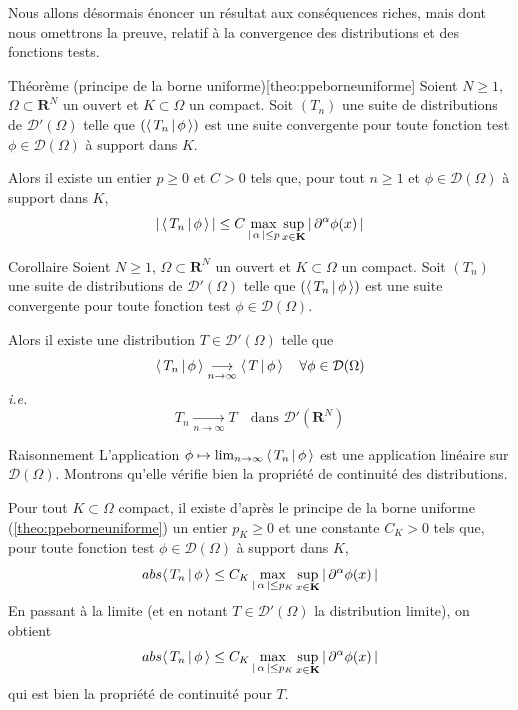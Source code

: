         Nous allons désormais énoncer un résultat aux conséquences riches, mais dont nous omettrons la preuve, relatif à la convergence des distributions et des fonctions tests.

        \begin{omed}{Théorème (principe de la borne uniforme)}[theo:ppeborneuniforme]
            Soient $N \geq 1$, $\Omega \subset \mathbf{R}^N$ un ouvert et $K \subset \Omega$ un compact. Soit $(T_n)$ une suite de distributions de $\mathcal{D}'(\Omega)$ telle que $(\left< \, T_n \, \middle| \, \phi \, \right>)$ est une suite convergente pour toute fonction test $\phi \in \mathcal{D}(\Omega)$ à support dans $K$. 
            
            Alors il existe un entier $p \geq 0$ et $C> 0$ tels que, pour tout $n \geq 1$ et $\phi \in \mathcal{D}(\Omega)$ à support dans $K$, 
            \[ \left\lvert \, \left< \, T_n \, \middle| \, \phi \, \right> \, \right\rvert \leq C \max_{\left\lvert \, \alpha \, \right\rvert \leq p} \sup_{x \in \mathbf{K}} \left\lvert \, \partial^{\alpha} \phi(x) \, \right\rvert \] 
        \end{omed}

        \begin{omed}{Corollaire}
            Soient $N \geq 1$, $\Omega \subset \mathbf{R}^N$ un ouvert et $K \subset \Omega$ un compact. Soit $(T_n)$ une suite de distributions de $\mathcal{D}'(\Omega)$ telle que $(\left< \, T_n \, \middle| \, \phi \, \right>)$ est une suite convergente pour toute fonction test $\phi \in \mathcal{D}(\Omega)$. 

            Alors il existe une distribution $T \in \mathcal{D}'(\Omega)$ telle que 
            \[ \left< \, T_n \, \middle| \, \phi \, \right> \underset{n \to \infty}{\longrightarrow} \left< \, T \, \middle| \, \phi \, \right> \quad \forall \phi \in \mathcal{D}(\Omega) \]  
            \textit{i.e.}
            \[ T_n \underset{n \to \infty}{\longrightarrow} T \quad \text{dans } \mathcal{D}'(\mathbf{R}^N) \]      
        \end{omed}

        \begin{demo}{Raisonnement}
            L’application $\phi \mapsto \lim_{n \to \infty} \left< \, T_n \, \middle| \, \phi \, \right>$ est une application linéaire sur $\mathcal{D}(\Omega)$. Montrons qu’elle vérifie bien la propriété de continuité des distributions.

            Pour tout $K \subset \Omega$ compact, il existe d’après le principe de la borne uniforme (\ref{theo:ppeborneuniforme}) un entier $p_K \geq 0$ et une constante $C_K > 0$ tels que, pour toute fonction test $\phi \in \mathcal{D}(\Omega)$ à support dans $K$,
            \[ abs{\left< \, T_n \, \middle| \, \phi \, \right>} \leq C_K \max_{\left\lvert \, \alpha \, \right\rvert \leq p_K} \sup_{x \in \mathbf{K}} \left\lvert \, \partial^{\alpha} \phi(x) \, \right\rvert \]
            En passant à la limite (et en notant $T \in \mathcal{D}'(\Omega)$ la distribution limite), on obtient 
            \[ abs{\left< \, T_n \, \middle| \, \phi \, \right>} \leq C_K \max_{\left\lvert \, \alpha \, \right\rvert \leq p_K} \sup_{x \in \mathbf{K}} \left\lvert \, \partial^{\alpha} \phi(x) \, \right\rvert \]
            qui est bien la propriété de continuité pour $T$.
        \end{demo}

